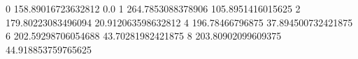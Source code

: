 0 158.89016723632812 0.0
1 264.7853088378906 105.8951416015625
2 179.80223083496094 20.912063598632812
4 196.78466796875 37.894500732421875
6 202.59298706054688 43.70281982421875
8 203.80902099609375 44.918853759765625
